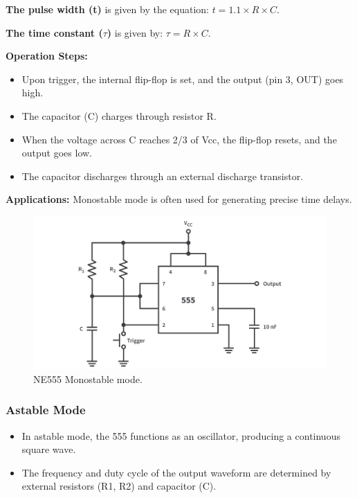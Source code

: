 \documentclass{article}
\begin{document}
\vspace{10pt}
\textbf{The pulse width (t)} is given by the equation: $t = 1.1 \times R \times C$.\par
\textbf{The time constant ($\tau$)} is given by: $\tau = R \times C$.\par
\vspace{10pt}
\textbf{Operation Steps:}

\begin{itemize}
    \item Upon trigger, the internal flip-flop is set, and the output (pin 3, OUT) goes high.
    \item The capacitor (C) charges through resistor R.
    \item When the voltage across C reaches 2/3 of Vcc, the flip-flop resets, and the output goes low.
    \item The capacitor discharges through an external discharge transistor.
\end{itemize}

\vspace{10pt}

\textbf{Applications:} Monostable mode is often used for generating precise time delays.

\begin{figure}[h]
    \centering
    \includegraphics[width=14cm]{Pic/Pictures/555-timer-monostable-operation-schematic-diagram.png}
    \caption{NE555 Monostable mode.}
    \label{fig:enter-label}
\end{figure}

\newpage
\subsubsection{Astable Mode}

\begin{itemize}
    \item In astable mode, the 555 functions as an oscillator, producing a continuous square wave.
    \item The frequency and duty cycle of the output waveform are determined by external resistors (R1, R2) and capacitor (C).
\end{itemize}
\end{document}

